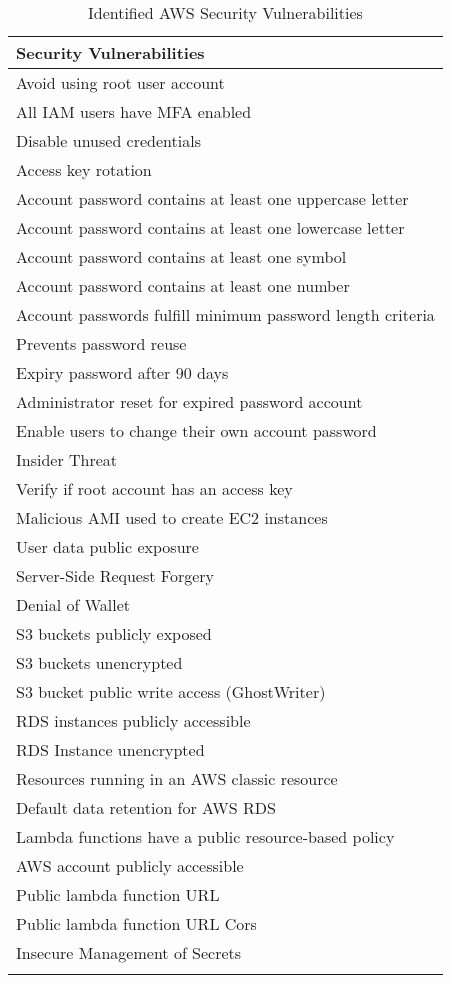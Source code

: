 \begin{longtable}{|p{10cm}|}
    \hline
    \textbf{Security Vulnerabilities}\\
    \hline
    Avoid using root user account \\
    \hline
    All IAM users have MFA enabled \\
    \hline
    Disable unused credentials \\
    \hline
    Access key rotation \\
    \hline
    Account password contains at least one uppercase letter \\
    \hline
    Account password contains at least one lowercase letter \\
    \hline
    Account password contains at least one symbol \\
    \hline
    Account password contains at least one number \\
    \hline
    Account passwords fulfill minimum password length
    criteria\\
    \hline
    Prevents password reuse \\
    \hline
    Expiry password after 90 days \\
    \hline
    Administrator reset for expired password account\\
    \hline
    Enable users to change their own account password \\
    \hline
    Insider Threat \\
    \hline
    Verify if root account has an access key \\
    \hline
    Malicious AMI used to create EC2 instances\\
    \hline
    User data public exposure \\
    \hline
    Server-Side Request Forgery \\
    \hline
    Denial of Wallet \\
    \hline
    S3 buckets publicly exposed\\
    \hline
    S3 buckets unencrypted \\
    \hline
    S3 bucket public write access (GhostWriter) \\
    \hline
    RDS instances publicly accessible \\
    \hline
    RDS Instance unencrypted \\
    \hline
    Resources running in an AWS classic resource \\
    \hline
    Default data retention for AWS RDS \\
    \hline
    Lambda functions have a public resource-based policy \\
    \hline
    AWS account publicly accessible  \\
    \hline
    Public lambda function URL \\
    \hline
    Public lambda function URL Cors \\
    \hline
    Insecure Management of Secrets \\
    \hline
    \caption{Identified AWS Security Vulnerabilities}
    \label{tab:identifiedsecurityvulnerabilities}
\end{longtable}









